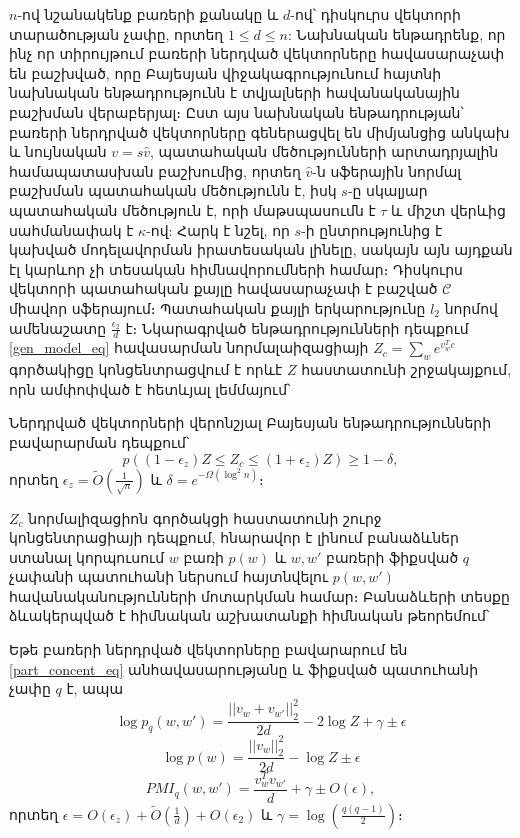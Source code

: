 \documentclass[11pt]{article}
\begin{document}
$n$-ով նշանակենք բառերի քանակը և $d$-ով՝ դիսկուրս վեկտորի տարածության չափը, որտեղ $1 \leq d \leq n$:  Նախնական ենթադրենք, որ ինչ որ տիրույթում բառերի ներդված վեկտորները հավասարաչափ են բաշխված, որը   Բայեսյան վիջակագրությունում հայտնի նախնական ենթադրությունն է տվյալների հավանականային բաշխման վերաբերյալ։ Ըստ այս նախնական ենթադրության՝ բառերի ներդրված վեկտորները  գեներացվել են միմյանցից անկախ և նույնական $v = s \hat v$, պատահական մեծությունների արտադրյալին համապատասխան բաշխումից,   որտեղ $\hat v$-ն սֆերային նորմալ բաշխման պատահական մեծությունն է, իսկ $s$-ը սկալյար պատահական մեծություն է, որի մաթսպասումն է $\tau$  և միշտ վերևից սահմանափակ է $\kappa$-ով: Հարկ է նշել, որ $s$-ի ընտրությունից է կախված մոդելավորման իրատեսական լինելը, սակայն այն այդքան էլ կարևոր չի տեսական հիմնավորումների համար։ Դիսկուրս վեկտորի պատահական քայլը հավասարաչափ է բաշված $\mathcal{C}$ միավոր սֆերայում։ Պատահական քայլի երկարությունը $l_2$ նորմով ամենաշատը $\frac{\epsilon_2}{d}$ է։ Նկարագրված ենթադրությունների դեպքում \ref{gen_model_eq} հավասարման նորմալաիզացիայի $Z_c = \sum_w{e^{v^T_wc}}$ գործակիցը կոնցենտրացվում է որևէ $Z$ հաստատունի շրջակայքում, որն ամփոփված է հետևյալ լեմմայում՝ 
\begin{lemma}
Ներդրված վեկտորների վերոնշյալ Բայեսյան ենթադրությունների բավարարման դեպքում՝
\begin{equation}
p((1-\epsilon_z)Z \leq Z_c \leq (1+\epsilon_z)Z) \geq 1- \delta,
\label{part_concent_eq}
\end{equation}
որտեղ $\epsilon_z = \widetilde O(\frac{1}{\sqrt{n}})$ և $\delta = e^{-\Omega \left({\log^2n} \right)}$։
\end{lemma}

$Z_c$ նորմալիզացիոն գործակցի հաստատունի շուրջ կոնցենտրացիայի դեպքում, հնարավոր է լինում բանաձևներ ստանալ կորպուսում $w$ բառի  $p(w)$ և $w, w'$ բառերի ֆիքսված $q$ չափանի պատուհանի ներսում հայտնվելու $p(w, w')$ հավանականությունների մոտարկման համար։ Բանաձևերի տեսքը ձևակերպված է հիմնական աշխատանքի հիմնական թեորեմում՝
\begin{theorem}
\label{main_thorem}
Եթե բառերի ներդրված վեկտորները բավարարում են  \ref{part_concent_eq} անհավասարությանը և ֆիքսված պատուհանի չափը $q$ է, ապա
\begin{equation}
\log p_q(w, w') = \frac{||v_w+v_{w'}||_2^2}{2d} - 2\log Z + \gamma \pm \epsilon
\label{pair_eq}
\end{equation}
\begin{equation}
\log p(w) = \frac{||v_w||_2^2}{2d} - \log Z \pm \epsilon
\label{mono_eq}
\end{equation}
\begin{equation}
PMI_q(w, w') = \frac{v^T_wv_{w'}}{d} + \gamma \pm O(\epsilon),
\label{pmi_eq}
\end{equation}
որտեղ $\epsilon = O(\epsilon_z) + \widetilde O(\frac{1}{d}) + O(\epsilon_2)$ և $\gamma = \log \left( \frac {q(q-1)}{2} \right)$։
\end{theorem}
\end{document}

